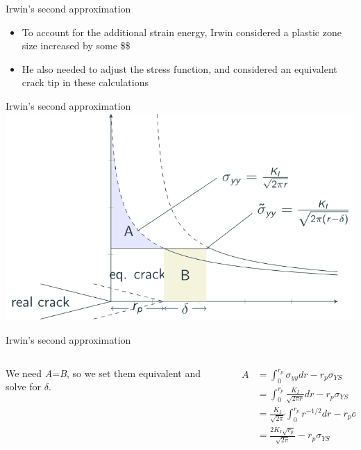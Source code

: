 \documentclass[
  letterpaper,
  ignorenonframetext,
  aspectratio=43,
  handout,
  12pt]{beamer}
\providecommand{\tightlist}{%
  \setlength{\itemsep}{0pt}\setlength{\parskip}{0pt}}
\providecommand{\tightlist}{%
\setlength{\itemsep}{0pt}\setlength{\parskip}{0pt}}
\let\Oldincludegraphics\includegraphics
\renewcommand{\includegraphics}[2][]{\Oldincludegraphics[width=\textwidth,height=0.7\textheight,keepaspectratio]{#2}}
\begin{document}
\begin{frame}{Irwin's second approximation}
\protect\hypertarget{irwins-second-approximation-2}{}
\begin{itemize}
\tightlist
\item
  To account for the additional strain energy, Irwin considered a
  plastic zone size increased by some \$\delta\$
\item
  He also needed to adjust the stress function, and considered an
  equivalent crack tip in these calculations
\end{itemize}
\end{frame}

\begin{frame}{Irwin's second approximation}
\protect\hypertarget{irwins-second-approximation-3}{}
\includegraphics{../images/plastic-equivalent.svg}
\end{frame}

\begin{frame}{Irwin's second approximation}
\protect\hypertarget{irwins-second-approximation-4}{}
\begin{columns}[T]
\begin{column}{0.5\textwidth}
We need \emph{A}=\emph{B}, so we set them equivalent and solve for
\(\delta\).
\end{column}

\begin{column}{0.5\textwidth}
\[\begin{aligned}
  A &= \int_{0}^{r_p} \sigma_{yy} dr - r_p \sigma_{YS}\\
  &= \int_{0}^{r_p} \frac{K_I}{\sqrt{2\pi r}} dr - r_p \sigma_{YS}\\
  &= \frac{K_I}{\sqrt{2\pi}}\int_{0}^{r_p} r^{-1/2} dr - r_p \sigma_{YS}\\
  &= \frac{2K_I \sqrt{r_p}}{\sqrt{2\pi}}- r_p \sigma_{YS}
\end{aligned}\]
\end{column}
\end{columns}
\end{frame}
\end{document}
